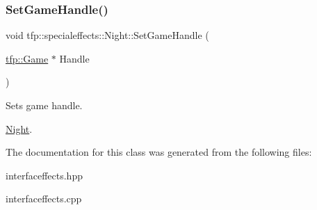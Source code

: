 \subsubsection{\texorpdfstring{Set\+Game\+Handle()}{SetGameHandle()}}
{\footnotesize\ttfamily void tfp\+::specialeffects\+::\+Night\+::\+Set\+Game\+Handle (\begin{DoxyParamCaption}\item[{\mbox{\hyperlink{classtfp_1_1_game}{tfp\+::\+Game}} $\ast$}]{Handle }\end{DoxyParamCaption})}



Sets game handle. 

\mbox{\hyperlink{classtfp_1_1specialeffects_1_1_night}{Night}}. 

The documentation for this class was generated from the following files\+:\begin{DoxyCompactItemize}
\item 
interfaceffects.\+hpp\item 
interfaceffects.\+cpp\end{DoxyCompactItemize}
